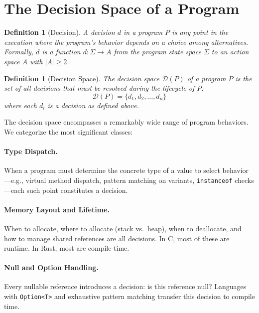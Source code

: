 \documentclass[11pt]{article}
\newtheorem{definition}[theorem]{Definition}
\newcommand{\DP}{\mathcal{D}(P)}
\begin{document}
\section{The Decision Space of a Program}
\label{sec:decision-space}

\begin{definition}[Decision]
\label{def:decision}
A \emph{decision} $d$ in a program $P$ is any point in the execution where the
program's behavior depends on a choice among alternatives. Formally, $d$ is a
function $d : \Sigma \to A$ from the program state space $\Sigma$ to an action
space $A$ with $|A| \geq 2$.
\end{definition}

\begin{definition}[Decision Space]
\label{def:decision-space}
The \emph{decision space} $\DP$ of a program $P$ is the set of all decisions
that must be resolved during the lifecycle of $P$:
\[
  \DP = \{ d_1, d_2, \ldots, d_n \}
\]
where each $d_i$ is a decision as defined above.
\end{definition}

The decision space encompasses a remarkably wide range of program behaviors. We
categorize the most significant classes:

\paragraph{Type Dispatch.}
When a program must determine the concrete type of a value to select behavior---e.g.,
virtual method dispatch, pattern matching on variants, \texttt{instanceof} checks---each
such point constitutes a decision.

\paragraph{Memory Layout and Lifetime.}
When to allocate, where to allocate (stack vs.\ heap), when to deallocate, and how to
manage shared references are all decisions. In C, most of these are runtime. In Rust,
most are compile-time.

\paragraph{Null and Option Handling.}
Every nullable reference introduces a decision: is this reference null? Languages with
\texttt{Option<T>} and exhaustive pattern matching transfer this decision to compile time.
\end{document}
